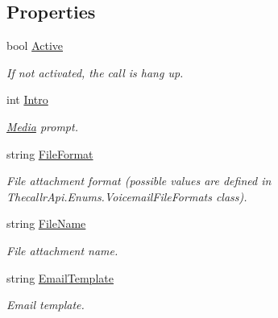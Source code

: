 \subsection*{Properties}
\begin{DoxyCompactItemize}
\item 
bool \hyperlink{class_thecallr_api_1_1_objects_1_1_app_1_1_param_1_1_vms_ac361875c2bbe9afb787095925fea6d58}{Active}
\begin{DoxyCompactList}\small\item\em If not activated, the call is hang up. \end{DoxyCompactList}\item 
int \hyperlink{class_thecallr_api_1_1_objects_1_1_app_1_1_param_1_1_vms_aa9fb2d9fe59dc28f3a8cb192f3af7be4}{Intro}
\begin{DoxyCompactList}\small\item\em \hyperlink{namespace_thecallr_api_1_1_objects_1_1_media}{Media} prompt. \end{DoxyCompactList}\item 
string \hyperlink{class_thecallr_api_1_1_objects_1_1_app_1_1_param_1_1_vms_ad6cfde4ca36277a2821d9194ab2063fc}{File\+Format}
\begin{DoxyCompactList}\small\item\em File attachment format (possible values are defined in Thecallr\+Api.\+Enums.\+Voicemail\+File\+Formats class). \end{DoxyCompactList}\item 
string \hyperlink{class_thecallr_api_1_1_objects_1_1_app_1_1_param_1_1_vms_a24db06489db2f2a78cb9cf2325792787}{File\+Name}
\begin{DoxyCompactList}\small\item\em File attachment name. \end{DoxyCompactList}\item 
string \hyperlink{class_thecallr_api_1_1_objects_1_1_app_1_1_param_1_1_vms_aafb848d0bde7e20f2f6dbb8763697545}{Email\+Template}
\begin{DoxyCompactList}\small\item\em Email template. \end{DoxyCompactList}\item 

\end{DoxyCompactItemize}
